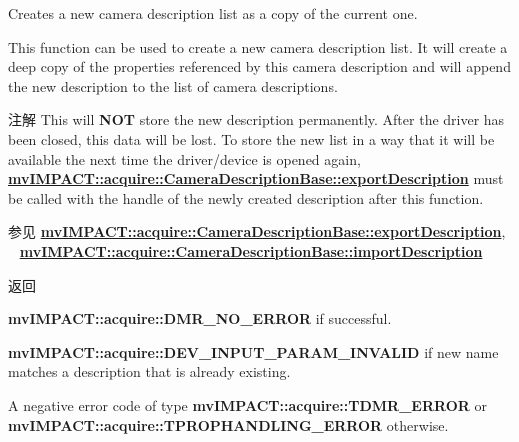 Creates a new camera description list as a copy of the current one. 

This function can be used to create a new camera description list. It will create a deep copy of the properties referenced by this camera description and will append the new description to the list of camera descriptions.

\begin{DoxyNote}{注解}
This will {\bfseries N\+O\+T} store the new description permanently. After the driver has been closed, this data will be lost. To store the new list in a way that it will be available the next time the driver/device is opened again, {\bfseries \hyperlink{classmv_i_m_p_a_c_t_1_1acquire_1_1_camera_description_base_a75ca8307f89a995695a8331f8a6ba463}{mv\+I\+M\+P\+A\+C\+T\+::acquire\+::\+Camera\+Description\+Base\+::export\+Description}} must be called with the handle of the newly created description after this function. 
\end{DoxyNote}
\begin{DoxySeeAlso}{参见}
{\bfseries \hyperlink{classmv_i_m_p_a_c_t_1_1acquire_1_1_camera_description_base_a75ca8307f89a995695a8331f8a6ba463}{mv\+I\+M\+P\+A\+C\+T\+::acquire\+::\+Camera\+Description\+Base\+::export\+Description}}, ~\newline
{\bfseries \hyperlink{classmv_i_m_p_a_c_t_1_1acquire_1_1_camera_description_base_aee33a8a6a0e801eae4684dcb2a84c841}{mv\+I\+M\+P\+A\+C\+T\+::acquire\+::\+Camera\+Description\+Base\+::import\+Description}} 
\end{DoxySeeAlso}
\begin{DoxyReturn}{返回}

\begin{DoxyItemize}
\item {\bfseries mv\+I\+M\+P\+A\+C\+T\+::acquire\+::\+D\+M\+R\+\_\+\+N\+O\+\_\+\+E\+R\+R\+O\+R} if successful.
\item {\bfseries mv\+I\+M\+P\+A\+C\+T\+::acquire\+::\+D\+E\+V\+\_\+\+I\+N\+P\+U\+T\+\_\+\+P\+A\+R\+A\+M\+\_\+\+I\+N\+V\+A\+L\+I\+D} if new name matches a description that is already existing.
\item A negative error code of type {\bfseries mv\+I\+M\+P\+A\+C\+T\+::acquire\+::\+T\+D\+M\+R\+\_\+\+E\+R\+R\+O\+R} or {\bfseries mv\+I\+M\+P\+A\+C\+T\+::acquire\+::\+T\+P\+R\+O\+P\+H\+A\+N\+D\+L\+I\+N\+G\+\_\+\+E\+R\+R\+O\+R} otherwise. 
\end{DoxyItemize}
\end{DoxyReturn}

